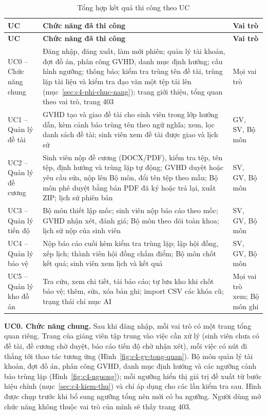 \documentclass[../main.tex]{subfiles}
\begin{document}
{\renewcommand{\arraystretch}{1.15}
\begin{longtable}{|p{2.6cm}|p{9.4cm}|p{2.6cm}|}
\caption{Tổng hợp kết quả thi công theo UC}\label{tab:c4-tong-hop-uc}\\
\hline
\textbf{UC} & \textbf{Chức năng đã thi công} & \textbf{Vai trò} \\
\hline
\endfirsthead
\hline
\textbf{UC} & \textbf{Chức năng đã thi công} & \textbf{Vai trò} \\
\hline
\endhead
UC0 -- Chức năng chung & Đăng nhập, đăng xuất, làm mới phiên; quản lý tài khoản, đợt đồ án, phân công GVHD, danh mục định hướng; cấu hình ngưỡng; thông báo; kiểm tra trùng tên đề tài, trùng lặp tài liệu và kiểm tra đạo văn một tệp tải lên (mục~\ref{sec:c4-phi-chuc-nang}); trang giới thiệu, tổng quan theo vai trò, trang 403 & Mọi vai trò \\
\hline
UC1 -- Quản lý đề tài & GVHD tạo và giao đề tài cho sinh viên trong lớp hướng dẫn, kèm cảnh báo trùng tên theo ngữ nghĩa; xem, lọc danh sách đề tài; sinh viên xem đề tài được giao và lịch sử & GV, SV, Bộ môn \\
\hline
UC2 -- Quản lý đề cương & Sinh viên nộp đề cương (DOCX/PDF), kiểm tra tệp, tên tệp, định hướng và trùng lặp tự động; GVHD duyệt hoặc yêu cầu sửa, nộp lên Bộ môn, đổi tên tệp theo mẫu; Bộ môn phê duyệt bằng bản PDF đã ký hoặc trả lại, xuất ZIP; lịch sử phiên bản & SV, GV, Bộ môn \\
\hline
UC3 -- Quản lý tiến độ & Bộ môn thiết lập mốc; sinh viên nộp báo cáo theo mốc; GVHD nhận xét, đánh giá; Bộ môn theo dõi toàn khoa; lịch sử nộp của sinh viên & SV, GV, Bộ môn \\
\hline
UC4 -- Quản lý bảo vệ & Nộp báo cáo cuối kèm kiểm tra trùng lặp; lập hội đồng, xếp lịch; thành viên hội đồng chấm điểm; Bộ môn chốt kết quả; sinh viên xem lịch và kết quả & SV, GV, Bộ môn \\
\hline
UC5 -- Quản lý kho đồ án & Tra cứu, xem chi tiết, tải báo cáo; tự lưu kho khi chốt bảo vệ; thêm, sửa, xóa bản ghi; import CSV các khóa cũ; trạng thái chỉ mục AI & Mọi vai trò xem; Bộ môn ghi \\
\hline
\end{longtable}
}

\textbf{UC0. Chức năng chung.} Sau khi đăng nhập, mỗi vai trò có một trang tổng quan riêng. Trang của giảng viên tập trung vào việc cần xử lý (sinh viên chưa có đề tài, đề cương chờ duyệt, báo cáo tiến độ chờ nhận xét), mỗi việc có nút đi thẳng tới thao tác tương ứng (Hình~\ref{fig:c4-gv-tong-quan}). Bộ môn quản lý tài khoản, đợt đồ án, phân công GVHD, danh mục định hướng và các ngưỡng cảnh báo trùng lặp (Hình~\ref{fig:c4-nguong}); mỗi ngưỡng hiển thị giá trị đề xuất từ bước hiệu chỉnh (mục~\ref{sec:c4-kiem-thu}) và chỉ áp dụng cho các lần kiểm tra sau. Hình được chụp trước khi bổ sung ngưỡng tổng nên mới có ba ngưỡng. Người dùng mở chức năng không thuộc vai trò của mình sẽ thấy trang 403.
\end{document}
